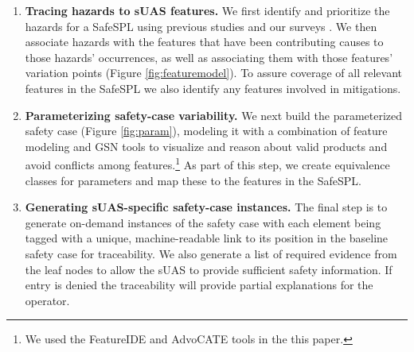 \begin{enumerate}
\item \textbf{Tracing hazards to sUAS features.} We first identify and prioritize the hazards for a SafeSPL using previous studies \cite{FAA} and our surveys \cite{gohar2024towards}. We then associate hazards with the features that have been contributing causes to those hazards' occurrences, as well as associating them with those features' variation points (Figure \ref{fig:featuremodel}). To assure  coverage  of all relevant features in the SafeSPL we also identify any features involved in mitigations. 

\item\textbf{Parameterizing safety-case variability.} 
We next build the parameterized safety case (Figure \ref{fig:param}), modeling it with a combination of feature modeling and GSN \cite{GSN} tools to visualize and reason about valid products and avoid conflicts among features.\footnote{We used the FeatureIDE\cite{featureide} and AdvoCATE\cite{advocate} tools in the this paper.} As part of this step, we create equivalence classes for parameters and map these to the features in the SafeSPL.

\item\textbf{Generating sUAS-specific safety-case instances.} The final step is to generate on-demand instances of the safety case with each element being tagged with a unique, machine-readable link to its position in the baseline safety case for traceability. We also generate a list of required evidence from the leaf nodes to allow the sUAS to provide sufficient safety information.  If entry is denied the traceability will provide partial explanations for the operator. 
\end{enumerate}














